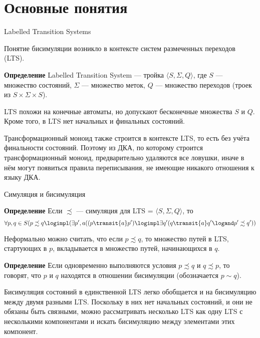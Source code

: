\section{Основные понятия}
\begin{frame}{Labelled Transition Systems}

Понятие бисимуляции возникло в контексте систем размеченных переходов (LTS).

\begin{block}{\bf Определение}
Labelled Transition System --- тройка $\langle S, \Sigma, Q\rangle$, где $S$ --- множество состояний, $\Sigma$ --- множество меток, $Q$ --- множество переходов (троек из $S\times\Sigma\times S$). 
\end{block} %

LTS похожи на конечные автоматы, но допускают бесконечные множества $S$ и $Q$. Кроме того, в LTS нет начальных и финальных состояний. %

\begin{exampleblock}{}
Трансформационный моноид также строится в контексте LTS, то есть без учёта финальности состояний. Поэтому из ДКА, по которому строится трансформационный моноид, предварительно удаляются все ловушки, иначе в нём могут появиться правила переписывания, не имеющие никакого отношения к языку ДКА.
\end{exampleblock}%
\end{frame}

\begin{frame}{Симуляция и бисимуляция}
\vspace*{-5pt}
\begin{block}{\bf Определение}
Если $\precsim$ --- симуляция для LTS = $\langle S, \Sigma, Q\rangle$, то
\[\forall p,q\in S(p\precsim q \logimpl (\exists p',a((p\transit{a} p')\logimpl\exists q'(q\transit{a}q'\logand p'\precsim q'))\]
\end{block} %

Неформально можно считать, что если $p\precsim q$, то множество путей в LTS, стартующих в $p$, вкладывается в множество путей, начинающихся в $q$.  %

\vspace*{-5pt}
\begin{block}{\bf Определение}
Если одновременно выполняются условия $p\precsim q$ и $q\precsim p$, то говорят, что $p$ и $q$ находятся в отношении бисимуляции (обозначается $p\sim q$).   
\end{block}  %
{Бисимуляция состояний в единственной LTS легко обобщается и на бисимуляцию между двумя разными LTS. Поскольку в них нет начальных состояний, и они не обязаны быть связными, можно рассматривать несколько LTS как одну LTS с несколькими компонентами и искать бисимуляцию между элементами этих компонент.}  %
\end{frame}

